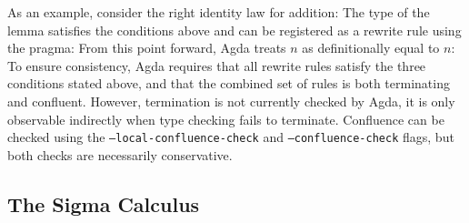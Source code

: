 \documentclass[screen,nonacm]{acmart}
\begin{document}
As an example, consider the right identity law for addition: \ERewrite{}The
type of the lemma satisfies the conditions above and can be registered as a
rewrite rule using the  pragma: \ERewriteIt{}From this
point forward, Agda treats $n$ \AgdaFunction{+}  as
definitionally equal to $n$: \ERewriteEx{}To ensure consistency, Agda requires
that all rewrite rules satisfy the three conditions stated above, and that the
combined set of rules is both terminating and confluent. However, termination
is not currently checked by Agda, it is only observable indirectly when type
checking fails to terminate. Confluence can be checked using the
\texttt{--local-confluence-check} and \texttt{--confluence-check} flags, but
both checks are necessarily conservative.

\subsection{The Sigma Calculus}\label{sec:pre-sig}
\end{document}
